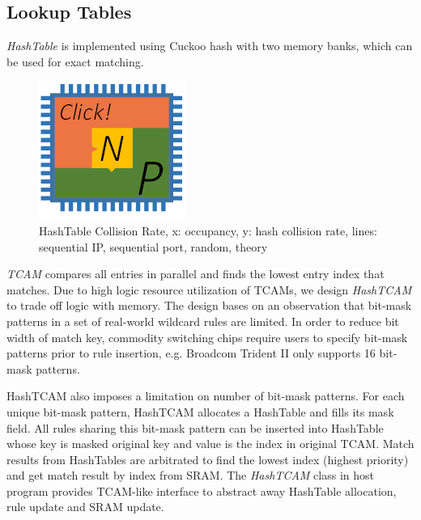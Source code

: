 \subsection{Lookup Tables}
\label{clicknp:subsec:lookuptables}

\textit{HashTable} is implemented using Cuckoo hash \cite{pagh2004cuckoo} with two memory banks, which can be used for exact matching.

\begin{figure}[h!]
	\centering
	\includegraphics[width=0.6\columnwidth]{image/logo}
	\vspace{-0.15in}
	\caption{HashTable Collision Rate, x: occupancy, y: hash collision rate, lines: sequential IP, sequential port, random, theory}
	\vspace{-0.15in}
	\label{clicknp:fig:HashTableCollisionRate}
\end{figure}

\textit{TCAM} compares all entries in parallel and finds the lowest entry index that matches. Due to high logic resource utilization of TCAMs, we design \textit{HashTCAM} to trade off logic with memory. The design bases on an observation that bit-mask patterns in a set of real-world wildcard rules are limited. In order to reduce bit width of match key, commodity switching chips require users to specify bit-mask patterns prior to rule insertion, e.g. Broadcom Trident II \cite{broadcomethernet} only supports 16 bit-mask patterns.

HashTCAM also imposes a limitation on number of bit-mask patterns. For each unique bit-mask pattern, HashTCAM allocates a HashTable and fills its mask field. All rules sharing this bit-mask pattern can be inserted into HashTable whose key is masked original key and value is the index in original TCAM. Match results from HashTables are arbitrated to find the lowest index (highest priority) and get match result by index from SRAM. The \textit{HashTCAM} class in host program provides TCAM-like interface to abstract away HashTable allocation, rule update and SRAM update.

